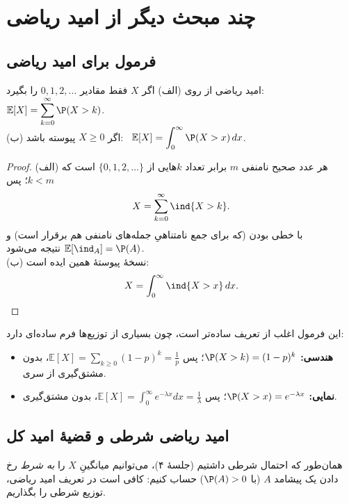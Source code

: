 
\section{چند مبحث دیگر از امید ریاضی}
\label{sec:expect-more}

\subsection{فرمول  برای امید ریاضی}

\begin{proposition}[label=prop:tail-sum]{امید ریاضی از روی }
(الف) اگر $X$ فقط مقادیر $0,1,2,\dots$ را بگیرد: \ $\displaystyle\mathbb E[X]=\sum_{k=0}^{\infty}\P(X>k)$.\\
(ب) اگر $X\ge0$ پیوسته باشد: \ $\displaystyle\mathbb E[X]=\int_0^\infty\P(X>x)\,dx$.
\end{proposition}

\begin{proof}
(الف) هر عدد صحیح نامنفی $m$ برابر تعداد $k$هایی از $\{0,1,2,\dots\}$ است که $k<m$؛ پس
\[ X=\sum_{k=0}^{\infty}\ind\{X>k\}. \]
با خطی بودن (که برای جمع نامتناهیِ جمله‌های نامنفی هم برقرار است) و $\mathbb E[\ind_A]=\P(A)$ نتیجه می‌شود.\\
(ب) نسخهٔ پیوستهٔ همین ایده است:
\[ X=\int_0^\infty\ind\{X>x\}\,dx. \]
\end{proof}

این فرمول اغلب از تعریف ساده‌تر است، چون  بسیاری از توزیع‌ها فرم ساده‌ای دارد:
\begin{itemize}
  \item \textbf{هندسی:} $\P(X>k)=(1-p)^k$؛ پس $\mathbb E[X]=\sum_{k\ge0}(1-p)^k=\frac1p$، بدون مشتق‌گیری از سری.
  \item \textbf{نمایی:} $\P(X>x)=e^{-\lambda x}$؛ پس $\mathbb E[X]=\int_0^\infty e^{-\lambda x}dx=\frac1\lambda$، بدون مشتق‌گیری.
\end{itemize}

\subsection{امید ریاضی شرطی و قضیهٔ امید کل}

همان‌طور که احتمال شرطی داشتیم (جلسهٔ ۴)، می‌توانیم میانگینِ $X$ را \emph{به شرط} رخ دادن یک پیشامد $A$ (با $\P(A)>0$) حساب کنیم: کافی است در تعریف امید ریاضی، توزیع شرطی را بگذاریم.

